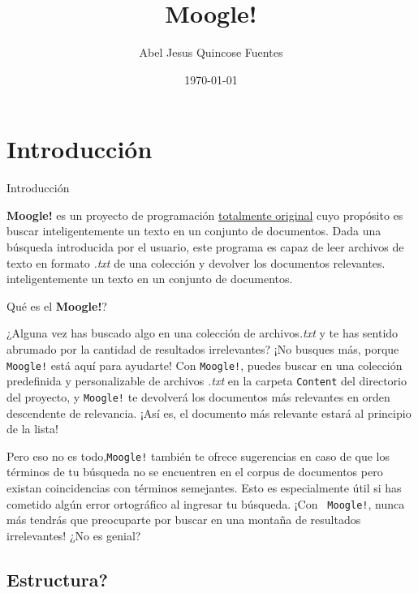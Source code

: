 \documentclass{beamer}
\title[Moogle!]{\LARGE Moogle!}
\author{Abel Jesus Quincose Fuentes}
\institute[Universidad de La Habana]
{
  Facultad de Matem\'atica y Computacin
}
\date{\today}
\begin{document}
\begin{frame}
  \maketitle
\end{frame}

\section{Introducción}

\begin{frame}{Introducción}
  
  \textbf{Moogle!} es un proyecto de programación \underline{totalmente original} cuyo propósito
    es buscar inteligentemente un texto en un conjunto de documentos.
    Dada una búsqueda introducida por el usuario, este programa es capaz de leer
    archivos de texto en formato \emph{.txt} de una colección y devolver los documentos relevantes.
  inteligentemente un texto en un conjunto de documentos.

\end{frame}

\begin{frame}{Qué es el \textbf{Moogle!}?}
    
         ¿Alguna vez has buscado algo en una colección de archivos\emph{.txt} y te has sentido abrumado por la cantidad de resultados irrelevantes? ¡No busques más, porque \texttt{Moogle!} está aquí para ayudarte! Con \texttt{Moogle!}, puedes buscar en una colección predefinida y personalizable de archivos \emph{.txt} en la carpeta \texttt{Content} del directorio del proyecto, y \texttt{Moogle!} te devolverá los documentos más relevantes en orden descendente de relevancia. ¡Así es, el documento más relevante estará al principio de la lista!

 Pero eso no es todo,\texttt{Moogle!} también te ofrece sugerencias en caso de que los términos de tu búsqueda no se encuentren en el corpus de documentos pero existan coincidencias con términos semejantes. Esto es especialmente útil si has cometido algún error ortográfico al ingresar tu búsqueda. ¡Con \texttt{ Moogle!}, nunca más tendrás que preocuparte por buscar en una montaña de resultados irrelevantes! ¿No es genial?
    
\end{frame}

\subsection{Estructura?}
\end{document}
